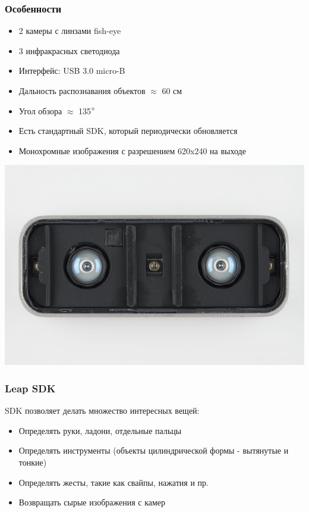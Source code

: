 \documentclass{beamer}
\begin{document}
		\begin{frame}
			\frametitle{Особенности}
			
			\begin{itemize}
				\item 2 камеры с линзами fish-eye
				\item 3 инфракрасных светодиода
				\item Интерфейс: USB 3.0 micro-B
				\item Дальность распознавания объектов $\approx$ 60 см
				\item Угол обзора $\approx$ 135$\degree$
				\item Есть стандартный SDK, который периодически обновляется
				\item Монохромные изображения с разрешением 620x240 на выходе
			\end{itemize}
			
			\begin{center}
				\includegraphics[scale=0.25]{images/LeapMotionDisassembled}
			\end{center}
		\end{frame}
		
		\begin{frame}
			\frametitle{Leap SDK}
			
			SDK позволяет делать множество интересных вещей:
			\begin{itemize}
				\item Определять руки, ладони, отдельные пальцы
				\item Определять инструменты (объекты цилиндрической формы - вытянутые и
					  тонкие)
				\item Определять жесты, такие как свайпы, нажатия и пр.
				\item Возвращать сырые изображения с камер
			\end{itemize}
		\end{frame}
		
\end{document}
